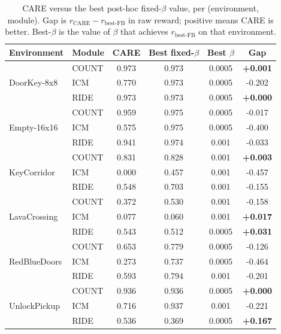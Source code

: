 \begin{table}[H]
\centering
\caption[CARE versus best fixed-$\beta$.]{CARE versus the best post-hoc fixed-$\beta$ value, per (environment, module). Gap is $r_\text{CARE} - r_\text{best-FB}$ in raw reward; positive means CARE is better. Best-$\beta$ is the value of $\beta$ that achieves $r_\text{best-FB}$ on that environment.}
\label{tab:care_vs_best_fixed}
\small
\setlength{\tabcolsep}{4pt}
\begin{tabular}{|l|l|c|c|c|c|}
\hline
\textbf{Environment} & \textbf{Module} & \textbf{CARE} & \textbf{Best fixed-$\beta$} & \textbf{Best $\beta$} & \textbf{Gap} \\
\hline
\multirow{3}{*}{DoorKey-8x8} & COUNT & 0.973 & 0.973 & 0.0005 & \textbf{+0.001} \\
\cline{2-6}
 & ICM & 0.770 & 0.973 & 0.0005 & -0.202 \\
\cline{2-6}
 & RIDE & 0.973 & 0.973 & 0.0005 & \textbf{+0.000} \\
\hline
\multirow{3}{*}{Empty-16x16} & COUNT & 0.959 & 0.975 & 0.0005 & -0.017 \\
\cline{2-6}
 & ICM & 0.575 & 0.975 & 0.0005 & -0.400 \\
\cline{2-6}
 & RIDE & 0.941 & 0.974 & 0.001 & -0.033 \\
\hline
\multirow{3}{*}{KeyCorridor} & COUNT & 0.831 & 0.828 & 0.001 & \textbf{+0.003} \\
\cline{2-6}
 & ICM & 0.000 & 0.457 & 0.001 & -0.457 \\
\cline{2-6}
 & RIDE & 0.548 & 0.703 & 0.001 & -0.155 \\
\hline
\multirow{3}{*}{LavaCrossing} & COUNT & 0.372 & 0.530 & 0.001 & -0.158 \\
\cline{2-6}
 & ICM & 0.077 & 0.060 & 0.001 & \textbf{+0.017} \\
\cline{2-6}
 & RIDE & 0.543 & 0.512 & 0.0005 & \textbf{+0.031} \\
\hline
\multirow{3}{*}{RedBlueDoors} & COUNT & 0.653 & 0.779 & 0.0005 & -0.126 \\
\cline{2-6}
 & ICM & 0.273 & 0.737 & 0.0005 & -0.464 \\
\cline{2-6}
 & RIDE & 0.593 & 0.794 & 0.001 & -0.201 \\
\hline
\multirow{3}{*}{UnlockPickup} & COUNT & 0.936 & 0.936 & 0.0005 & \textbf{+0.000} \\
\cline{2-6}
 & ICM & 0.716 & 0.937 & 0.001 & -0.221 \\
\cline{2-6}
 & RIDE & 0.536 & 0.369 & 0.0005 & \textbf{+0.167} \\
\hline
\end{tabular}
\end{table}